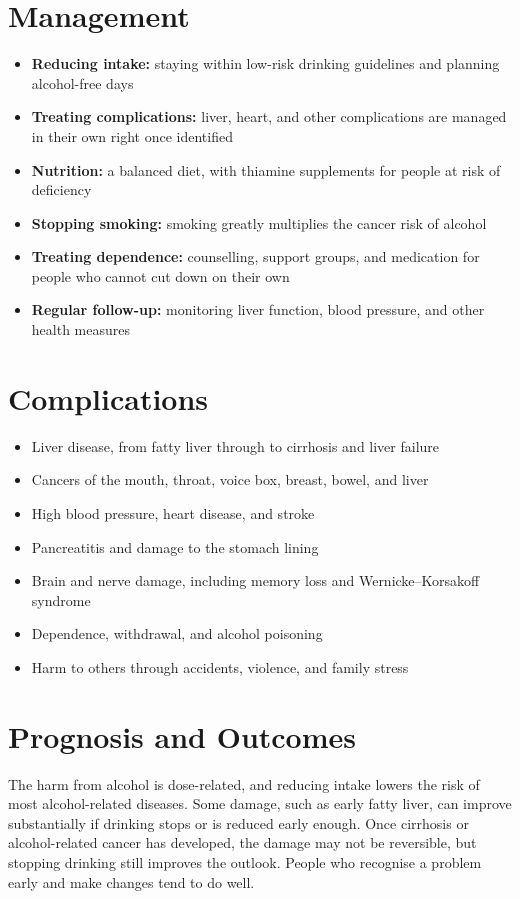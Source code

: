 \section*{Management}
\begin{itemize}
    \item \textbf{Reducing intake:} staying within low-risk drinking guidelines and planning alcohol-free days
    \item \textbf{Treating complications:} liver, heart, and other complications are managed in their own right once identified
    \item \textbf{Nutrition:} a balanced diet, with thiamine supplements for people at risk of deficiency
    \item \textbf{Stopping smoking:} smoking greatly multiplies the cancer risk of alcohol
    \item \textbf{Treating dependence:} counselling, support groups, and medication for people who cannot cut down on their own
    \item \textbf{Regular follow-up:} monitoring liver function, blood pressure, and other health measures
\end{itemize}

\section*{Complications}
\begin{itemize}
    \item Liver disease, from fatty liver through to cirrhosis and liver failure
    \item Cancers of the mouth, throat, voice box, breast, bowel, and liver
    \item High blood pressure, heart disease, and stroke
    \item Pancreatitis and damage to the stomach lining
    \item Brain and nerve damage, including memory loss and Wernicke--Korsakoff syndrome
    \item Dependence, withdrawal, and alcohol poisoning
    \item Harm to others through accidents, violence, and family stress
\end{itemize}

\section*{Prognosis and Outcomes}
The harm from alcohol is dose-related, and reducing intake lowers the risk of most alcohol-related diseases. Some damage, such as early fatty liver, can improve substantially if drinking stops or is reduced early enough. Once cirrhosis or alcohol-related cancer has developed, the damage may not be reversible, but stopping drinking still improves the outlook. People who recognise a problem early and make changes tend to do well.


